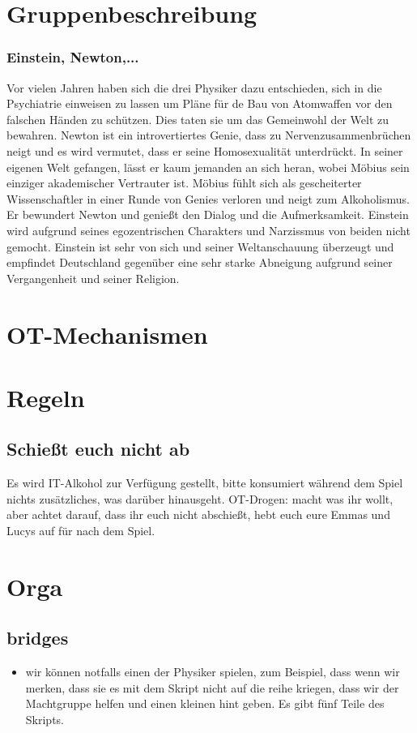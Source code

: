 \documentclass[12pt, a4paper, openany]{report}
\begin{document}
\chapter{Gruppenbeschreibung}

\subsection{Einstein, Newton,...}
Vor vielen Jahren haben sich die drei Physiker dazu entschieden, sich in die Psychiatrie einweisen zu lassen um Pläne für de Bau von Atomwaffen vor den falschen Händen zu schützen. 
Dies taten sie um das Gemeinwohl der Welt zu bewahren.
Newton ist ein introvertiertes Genie, dass zu Nervenzusammenbrüchen neigt und es wird vermutet, dass er seine Homosexualität unterdrückt. 
In seiner eigenen Welt gefangen, lässt er kaum jemanden an sich heran, wobei Möbius sein einziger akademischer Vertrauter ist. 
Möbius fühlt sich als gescheiterter Wissenschaftler in einer Runde von Genies verloren und neigt zum Alkoholismus. 
Er bewundert Newton und genießt den Dialog und die Aufmerksamkeit. 
Einstein wird aufgrund seines egozentrischen Charakters und Narzissmus von beiden nicht gemocht. 
Einstein ist sehr von sich und seiner Weltanschauung überzeugt und empfindet Deutschland gegenüber eine sehr starke Abneigung aufgrund seiner Vergangenheit und seiner Religion. 


\chapter{OT-Mechanismen}

\chapter{Regeln}
\section{Schießt euch nicht ab}
Es wird IT-Alkohol zur Verfügung gestellt, bitte konsumiert während dem Spiel nichts zusätzliches, was darüber hinausgeht.
OT-Drogen: macht was ihr wollt, aber achtet darauf, dass ihr euch nicht abschießt, hebt euch eure Emmas und Lucys auf für nach dem Spiel.

\chapter{Orga}
\section {bridges}
\begin{itemize}
    \item wir können notfalls einen der Physiker spielen, zum Beispiel, dass wenn wir merken, dass sie es mit dem Skript nicht auf die reihe kriegen, dass wir der Machtgruppe helfen und einen kleinen hint geben. Es gibt fünf Teile des Skripts.
\end{itemize}
\end{document}
